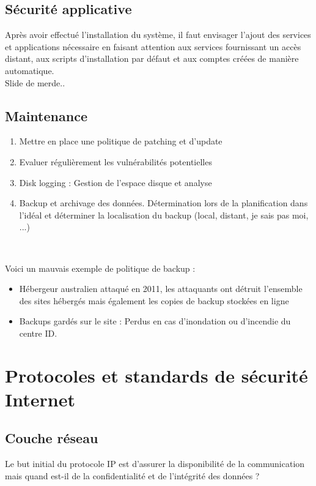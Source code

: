 \documentclass{report}
\begin{document}
\section{Sécurité applicative}

Après avoir effectué l'installation du système, il faut envisager l'ajout des services et applications nécessaire en faisant attention aux services fournissant un accès distant, aux scripts d'installation par défaut et aux comptes créées de manière automatique.\\

Slide de merde..

\section{Maintenance}

\begin{enumerate}
    \item Mettre en place une politique de patching et d'update
    \item Evaluer régulièrement les vulnérabilités potentielles
    \item Disk logging : Gestion de l'espace disque et analyse
    \item Backup et archivage des données. Détermination lors de la planification dans l'idéal et déterminer la localisation du backup (local, distant, je sais pas moi, ...)
\end{enumerate}~

Voici un mauvais exemple de politique de backup :
\begin{itemize}
    \item Hébergeur australien attaqué en 2011, les attaquants ont détruit l’ensemble des sites hébergés mais également les copies de backup stockées en ligne
    \item Backups gardés sur le site : Perdus en cas d’inondation ou d’incendie du centre ID.
\end{itemize}


\chapter{Protocoles et standards de sécurité Internet}

\section{Couche réseau}

Le but initial du protocole IP est d'assurer la disponibilité de la communication mais quand est-il de la confidentialité et de l'intégrité des données ?
\end{document}
